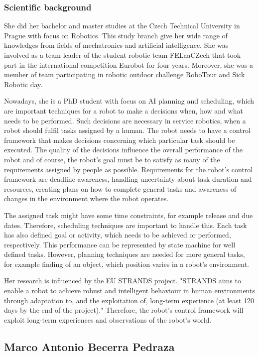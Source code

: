 \documentclass[conference]{IEEEtran}
\begin{document}
\subsubsection*{Scientific background}
She did her bachelor and master studies at the Czech Technical University in Prague with focus on Robotics. This study branch give her wide range of knowledges from fields of mechatronics and artificial intelligence. She was involved as a team leader of the student robotic team FELaaCZech that took part in the international competition Eurobot for four years. Moreover, she was a member of team participating in robotic outdoor challenge RoboTour and Sick Robotic day. 

Nowadays, she is a PhD student with focus on AI planning and scheduling, which are important techniques for a robot to make a decisions when, how and what needs to be performed. Such decisions are necessary in service robotics, when a robot should fulfil tasks assigned by a human. 
The robot needs to have a control framework that makes decisions concerning which particular task should be executed. The quality of the decisions influence the overall performance of the robot and of course, the robot's goal must be to satisfy as many of the requirements assigned by people as possible. Requirements for the robot's control framework are deadline awareness, handling uncertainty about task duration and resources, creating plans on how to complete general tasks and awareness of changes in the environment where the robot operates. 

The assigned task might have some time constraints, for example release and due dates. Therefore, scheduling techniques are important to handle this. Each task has also defined goal or activity, which needs to be achieved or performed, respectively. This performance can be represented by state machine for well defined tasks. However, planning techniques are needed for more general tasks, for example finding of an object, which position varies  in a robot's environment.

Her research is influenced by the EU STRANDS project. "STRANDS aims to enable a robot to achieve robust and intelligent behaviour in human environments through adaptation to, and the exploitation of, long-term experience (at least 120 days by the end of the project)." \cite{strands}
Therefore, the robot's control framework will exploit long-term experiences and observations of the robot's world. 

\subsection{Marco Antonio Becerra Pedraza}
\end{document}
